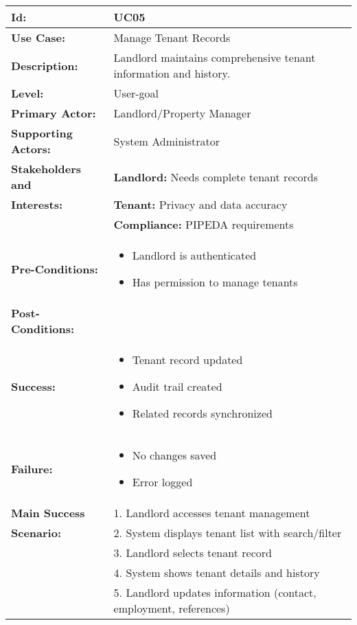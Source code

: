 \documentclass[12pt]{article}
\begin{document}
\begin{tabular}{|p{3cm}|p{11cm}|}
\hline
\textbf{Id:} & UC05 \\
\hline
\textbf{Use Case:} & Manage Tenant Records \\
\hline
\textbf{Description:} & Landlord maintains comprehensive tenant information and history. \\
\hline
\textbf{Level:} & User-goal \\
\hline
\textbf{Primary Actor:} & Landlord/Property Manager \\
\hline
\textbf{Supporting Actors:} & System Administrator \\
\hline
\textbf{Stakeholders and} & \textbf{Landlord:} Needs complete tenant records \\
\textbf{Interests:} & \textbf{Tenant:} Privacy and data accuracy \\
& \textbf{Compliance:} PIPEDA requirements \\
\hline
\textbf{Pre-Conditions:} & 
\begin{itemize}
    \item Landlord is authenticated
    \item Has permission to manage tenants
\end{itemize} \\
\hline
\textbf{Post-Conditions:} & \\
\textbf{Success:} & 
\begin{itemize}
    \item Tenant record updated
    \item Audit trail created
    \item Related records synchronized
\end{itemize} \\
\textbf{Failure:} & 
\begin{itemize}
    \item No changes saved
    \item Error logged
\end{itemize} \\
\hline
\textbf{Main Success} & 1. Landlord accesses tenant management \\
\textbf{Scenario:} & 2. System displays tenant list with search/filter \\
& 3. Landlord selects tenant record \\
& 4. System shows tenant details and history \\
& 5. Landlord updates information (contact, employment, references) \\

\end{tabular}
\end{document}
